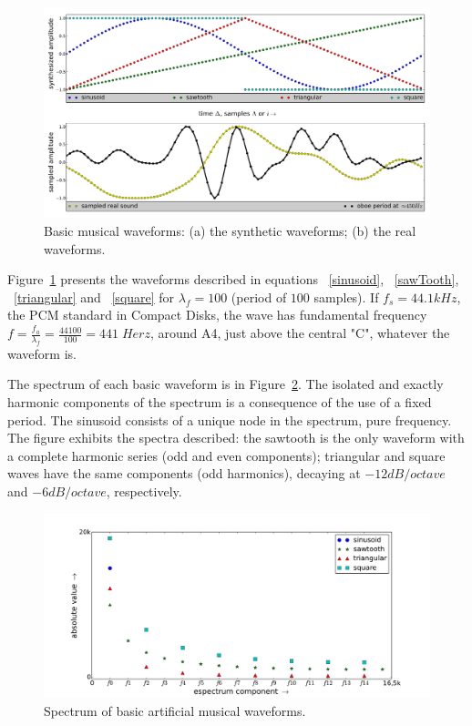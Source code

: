 \begin{figure}
    \centering
        \includegraphics[width=.7\textwidth]{figures/waveForms_}
    \caption{Basic musical waveforms: (a) the synthetic  waveforms; (b) the real waveforms.}
        \label{fig:formasDeOnda}
\end{figure}

Figure~\ref{fig:formasDeOnda} presents the waveforms described in equations  ~\ref{sinusoid}, ~\ref{sawTooth}, ~\ref{triangular} and ~\ref{square} for $\lambda_f=100$ (period of $100$ samples). If $f_s=44.1kHz$, the PCM standard in Compact Disks, the wave has fundamental frequency $f=\frac{f_a}{\lambda_f}=\frac{44100}{100} = 441 \; Herz$, around A4, just above the central "C", whatever the waveform is.

The spectrum of each basic waveform is in Figure~\ref{fig:espectroDeOndas}. The isolated and exactly harmonic components of the spectrum is a consequence of the use of a fixed period. The sinusoid consists of a unique node in the spectrum, pure frequency. The figure exhibits the spectra described: the sawtooth is the only waveform with a complete harmonic series (odd and even components); triangular and square waves have the same components (odd harmonics), decaying at $-12dB/octave$ and $-6dB/octave$, respectively.

\begin{figure}
    \centering
        \includegraphics[width=.7\textwidth]{figures/waveSpectrum}
    \caption{Spectrum of basic artificial musical waveforms.}
        \label{fig:espectroDeOndas}
\end{figure}

